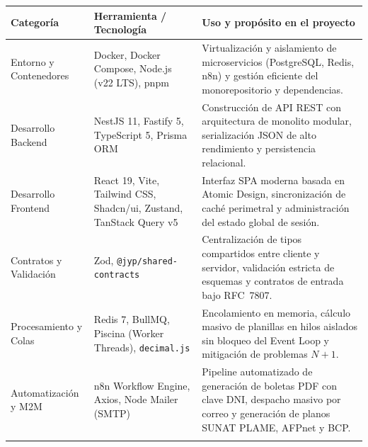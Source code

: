 \par
\noindent
\begin{minipage}{\linewidth}

    \begingroup
    \renewcommand{\baselinestretch}{1}
    \footnotesize
    \setlength{\tabcolsep}{4pt}
    \renewcommand{\arraystretch}{1.25}

    \begin{tabularx}{\linewidth}{@{}p{3.2cm}p{4.6cm}X@{}}
        \toprule
        \textbf{Categoría} & \textbf{Herramienta / Tecnología} & \textbf{Uso y propósito en el proyecto} \\ \midrule
            Entorno y Contenedores & 
            Docker, Docker Compose, Node.js (v22 LTS), pnpm & 
            Virtualización y aislamiento de microservicios (PostgreSQL, Redis, n8n) y gestión eficiente del monorepositorio y dependencias. \\ \addlinespace
            
            Desarrollo Backend & 
            NestJS 11, Fastify 5, TypeScript 5, Prisma ORM & 
            Construcción de API REST con arquitectura de monolito modular, serialización JSON de alto rendimiento y persistencia relacional. \\ \addlinespace
        
            Desarrollo Frontend & 
            React 19, Vite, Tailwind CSS, Shadcn/ui, Zustand, TanStack Query v5 & 
            Interfaz SPA moderna basada en Atomic Design, sincronización de caché perimetral y administración del estado global de sesión. \\ \addlinespace
        
            Contratos y Validación & 
            Zod, \texttt{@jyp/shared-contracts} & 
            Centralización de tipos compartidos entre cliente y servidor, validación estricta de esquemas y contratos de entrada bajo RFC~7807. \\ \addlinespace
        
            Procesamiento y Colas & 
            Redis 7, BullMQ, Piscina (Worker Threads), \texttt{decimal.js} & 
            Encolamiento en memoria, cálculo masivo de planillas en hilos aislados sin bloqueo del Event Loop y mitigación de problemas $N+1$. \\ \addlinespace
            
            Automatización y M2M & 
            n8n Workflow Engine, Axios, Node Mailer (SMTP) & 
            Pipeline automatizado de generación de boletas PDF con clave DNI, despacho masivo por correo y generación de planos SUNAT PLAME, AFPnet y BCP. \\ \addlinespace
            

\end{tabularx}
\end{minipage}
